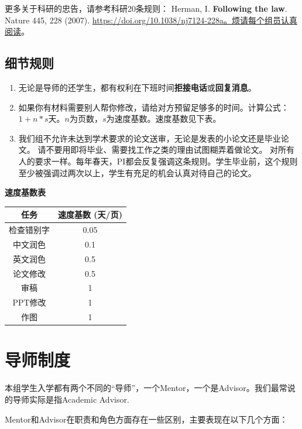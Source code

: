 \documentclass[
]{ctexbook}
\providecommand{\tightlist}{%
  \setlength{\itemsep}{0pt}\setlength{\parskip}{0pt}}
\begin{document}
更多关于科研的忠告，请参考科研20条规则：
Herman, I. \textbf{Following the law}. Nature 445, 228 (2007). \url{https://doi.org/10.1038/nj7124-228a。烦请每个组员认真阅读}。

\hypertarget{ux7ec6ux8282ux89c4ux5219}{%
\subsection{细节规则}\label{ux7ec6ux8282ux89c4ux5219}}

\begin{enumerate}
\def\labelenumi{\arabic{enumi}.}
\tightlist
\item
  无论是导师的还学生，都有权利在下班时间\textbf{拒接电话}或\textbf{回复消息}。
\item
  如果你有材料需要别人帮你修改，请给对方预留足够多的时间。计算公式：\(1+n*s\)天。\(n\)为页数，\(s\)为速度基数。速度基数见下表。
\item
  我们组不允许未达到学术要求的论文送审，无论是发表的小论文还是毕业论文。
  请不要用即将毕业、需要找工作之类的理由试图糊弄着做论文。
  对所有人的要求一样。每年春天，PI都会反复强调这条规则。学生毕业前，这个规则至少被强调过两次以上，学生有充足的机会认真对待自己的论文。
\end{enumerate}

\textbf{速度基数表}

\begin{longtable}[]{@{}cc@{}}
\toprule\noalign{}
任务 & 速度基数 (天/页) \\
\midrule\noalign{}
\endhead
\bottomrule\noalign{}
\endlastfoot
检查错别字 & 0.05 \\
中文润色 & 0.1 \\
英文润色 & 0.5 \\
论文修改 & 0.5 \\
审稿 & 1 \\
PPT修改 & 1 \\
作图 & 1 \\
\end{longtable}

\hypertarget{advisor}{%
\section{导师制度}\label{advisor}}

本组学生入学都有两个不同的``导师''，一个Mentor，一个是Advisor。我们最常说的导师实际是指Academic Advisor.

Mentor和Advisor在职责和角色方面存在一些区别，主要表现在以下几个方面：
\end{document}
